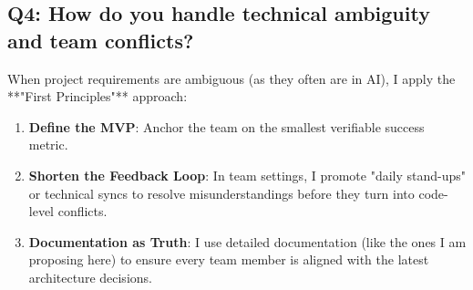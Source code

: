\documentclass[12pt,a4paper]{article}
\begin{document}
\subsection*{Q4: How do you handle technical ambiguity and team conflicts?}

When project requirements are ambiguous (as they often are in AI), I apply the **"First Principles"** approach:
\begin{enumerate}
    \item \textbf{Define the MVP}: Anchor the team on the smallest verifiable success metric.
    \item \textbf{Shorten the Feedback Loop}: In team settings, I promote "daily stand-ups" or technical syncs to resolve misunderstandings before they turn into code-level conflicts.
    \item \textbf{Documentation as Truth}: I use detailed documentation (like the ones I am proposing here) to ensure every team member is aligned with the latest architecture decisions.
\end{enumerate}
\end{document}

